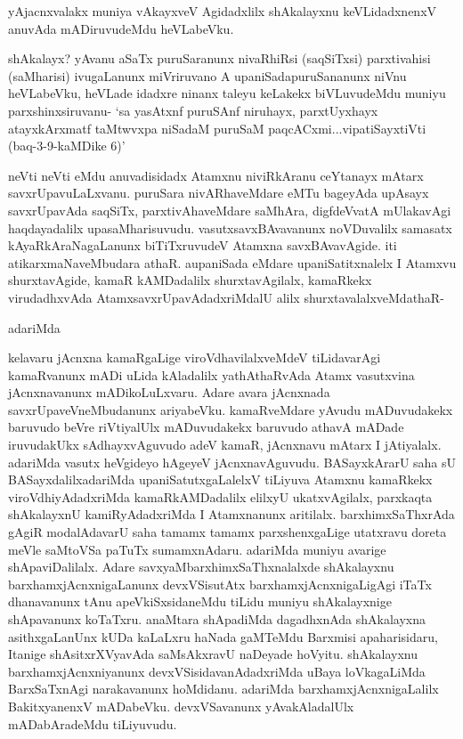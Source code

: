 \begin{artha}
yAjacnxvalakx muniya vAkayxveV Agidadxlilx shAkalayxnu keVLidadxnenxV anuvAda mADiruvudeMdu heVLabeVku. 
\end{artha}


\begin{artha}
shAkalayx? yAvanu aSaTx puruSaranunx nivaRhiRsi (saqSiTxsi) parxtivahisi (saMharisi) ivugaLanunx miVriruvano A upaniSadapuruSananunx niVnu heVLabeVku, heVLade idadxre ninanx taleyu keLakekx biVLuvudeMdu muniyu parxshinxsiruvanu- `sa yasAtxnf puruSAnf niruhayx, parxtUyxhayx atayxkArxmatf taMtwvxpa niSadaM puruSaM paqcACxmi...vipatiSayxtiVti (baq-3-9-kaMDike 6)'
\end{artha}

\begin{artha}
neVti neVti eMdu anuvadisidadx Atamxnu niviRkAranu ceYtanayx mAtarx savxrUpavuLaLxvanu. puruSara nivARhaveMdare eMTu bageyAda upAsayx savxrUpavAda saqSiTx, parxtivAhaveMdare saMhAra, digfdeVvatA mUlakavAgi haqdayadalilx upasaMharisuvudu. vasutxsavxBAvavanunx noVDuvalilx samasatx kAyaRkAraNagaLanunx biTiTxruvudeV Atamxna savxBAvavAgide. iti atikarxmaNaveMbudara athaR. aupaniSada eMdare upaniSatitxnalelx I Atamxvu shurxtavAgide, kamaR kAMDadalilx shurxtavAgilalx, kamaRkekx virudadhxvAda AtamxsavxrUpavAdadxriMdalU alilx shurxtavalalxveMdathaR-
\end{artha}

adariMda
\begin{artha}
kelavaru jAcnxna kamaRgaLige viroVdhavilalxveMdeV tiLidavarAgi kamaRvanunx mADi uLida kAladalilx yathAthaRvAda Atamx vasutxvina jAcnxnavanunx mADikoLuLxvaru. Adare avara jAcnxnada savxrUpaveVneMbudanunx ariyabeVku. kamaRveMdare yAvudu mADuvudakekx baruvudo beVre riVtiyalUlx mADuvudakekx baruvudo athavA mADade iruvudakUkx sAdhayxvAguvudo adeV kamaR, jAcnxnavu mAtarx I jAtiyalalx. adariMda vasutx heVgideyo hAgeyeV jAcnxnavAguvudu. BASayxkArarU saha sU BASayxdalilx\mdash  adariMda upaniSatutxgaLalelxV tiLiyuva Atamxnu kamaRkekx viroVdhiyAdadxriMda kamaRkAMDadalilx elilxyU ukatxvAgilalx, parxkaqta  shAkalayxnU kamiRyAdadxriMda I Atamxnanunx aritilalx. barxhimxSaThxrAda gAgiR modalAdavarU saha tamamx tamamx parxshenxgaLige utatxravu doreta meVle saMtoVSa paTuTx sumamxnAdaru. adariMda muniyu avarige shApaviDalilalx. Adare savxyaMbarxhimxSaThxnalalxde shAkalayxnu barxhamxjAcnxnigaLanunx devxVSisutAtx barxhamxjAcnxnigaLigAgi iTaTx dhanavanunx tAnu apeVkiSxsidaneMdu tiLidu muniyu shAkalayxnige shApavanunx koTaTxru. anaMtara shApadiMda dagadhxnAda shAkalayxna asithxgaLanUnx kUDa kaLaLxru haNada gaMTeMdu Barxmisi apaharisidaru, Itanige shAsitxrXVyavAda saMsAkxravU naDeyade hoVyitu. shAkalayxnu barxhamxjAcnxniyanunx devxVSisidavanAdadxriMda uBaya loVkagaLiMda BarxSaTxnAgi narakavanunx hoMdidanu. adariMda barxhamxjAcnxnigaLalilx BakitxyanenxV mADabeVku. devxVSavanunx yAvakAladalUlx mADabAradeMdu tiLiyuvudu. 
\end{artha}%

